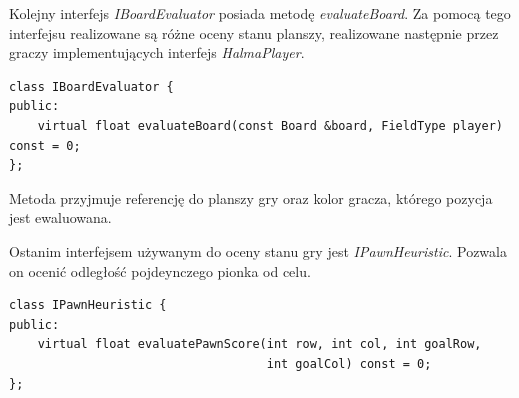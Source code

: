 \documentclass[a4paper, 12pt]{article}
\begin{document}
Kolejny interfejs \textit{IBoardEvaluator} posiada metodę \textit{evaluateBoard}.
Za pomocą tego interfejsu realizowane są różne oceny stanu planszy, 
realizowane następnie przez graczy implementujących interfejs \textit{HalmaPlayer}.
\begin{lstlisting}
class IBoardEvaluator {
public:
    virtual float evaluateBoard(const Board &board, FieldType player) const = 0;
};
\end{lstlisting}
Metoda przyjmuje referencję do planszy gry oraz kolor gracza, którego pozycja 
jest ewaluowana.

Ostanim interfejsem używanym do oceny stanu gry jest \textit{IPawnHeuristic}.
Pozwala on ocenić odległość pojdeynczego pionka od celu.
\begin{lstlisting}
class IPawnHeuristic {
public:
    virtual float evaluatePawnScore(int row, int col, int goalRow,
                                    int goalCol) const = 0;
};
\end{lstlisting}
\end{document}
